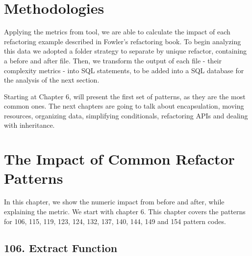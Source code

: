 \section{Methodologies}

Applying the metrics from \cite{article:mozilla} tool, we are able to calculate the impact of each refactoring example
described in Fowler's refactoring book. To begin analyzing this data we adopted a folder strategy to separate by unique refactor,
containing a before and after file. Then, we transform the output of each file - their complexity metrics - into SQL statements,
to be added into a SQL database for the analysis of the next section.

Starting at Chapter 6, \cite{book:refactoring} will present the first set of patterns, as they are the most common ones.
The next chapters are going to talk about encapsulation, moving resources, organizing data, simplifying conditionals,
refactoring APIs and dealing with inheritance.

\section{The Impact of Common Refactor Patterns}

In this chapter, we show the numeric impact from before and after, while explaining the metric. We start with chapter 6.
This chapter covers the patterns for 106, 115, 119, 123, 124, 132, 137, 140, 144, 149 and 154 pattern codes.
\subsection{ 106.  Extract Function }

